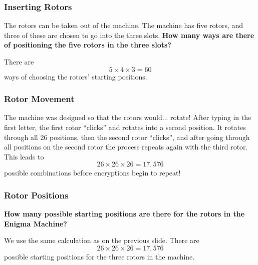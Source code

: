 \documentclass{beamer}
\newcommand{\<}{\langle}
\renewcommand{\>}{\rangle}
\begin{document}
\begin{frame}
\frametitle{Inserting Rotors}

The rotors can be taken out of the machine. The machine has five rotors, and three of these are chosen to go into the three slots. \textbf{How many ways are there of positioning the five rotors in the three slots?}\newline

There are 
\[
5\times 4 \times 3 = 60
\]
ways of choosing the rotors' starting positions. 
\end{frame}


\begin{frame}
\frametitle{Rotor Movement}

The machine was designed so that the rotors would... rotate! After typing in the first letter, the first rotor ``clicks'' and rotates into a second position. It rotates through all 26 positions, then the second rotor ``clicks'', and after going through all positions on the second rotor the process repeats again with the third rotor. This leads to 
\[
26 \times 26 \times 26 = 17,576
\] 
possible combinations before encryptions begin to repeat! 
\end{frame}

\begin{frame}
\frametitle{Rotor Positions}

\textbf{How many possible starting positions are there for the rotors in the Enigma Machine?}\newline

We use the same calculation as on the previous slide. There are
\[
26 \times 26 \times 26 = 17,576
\] 
possible starting positions for the three rotors in the machine. 
\end{frame}
\end{document}
